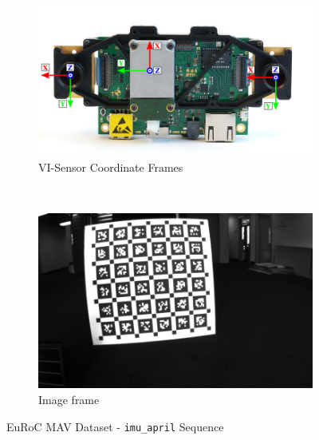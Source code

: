 \begin{figure}[htp]
  \centering
  \begin{subfigure}[b]{0.47\textwidth}
    \includegraphics{images/quaternion/visensor_frames}
    \caption{VI-Sensor Coordinate Frames}
  \end{subfigure}
  ~ \quad
  \begin{subfigure}[b]{0.47\textwidth}
    \includegraphics[width=\textwidth]{images/quaternion/1404733405732800000}
    \caption{Image frame}
  \end{subfigure}
  \caption{EuRoC MAV Dataset - \texttt{imu\_april} Sequence}
\end{figure}

